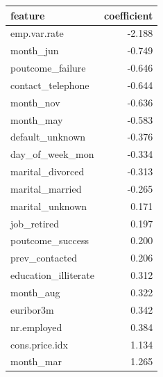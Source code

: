 \begin{tabular}{lr}
\toprule
feature & coefficient \\
\midrule
emp.var.rate & -2.188 \\
month\_jun & -0.749 \\
poutcome\_failure & -0.646 \\
contact\_telephone & -0.644 \\
month\_nov & -0.636 \\
month\_may & -0.583 \\
default\_unknown & -0.376 \\
day\_of\_week\_mon & -0.334 \\
marital\_divorced & -0.313 \\
marital\_married & -0.265 \\
marital\_unknown & 0.171 \\
job\_retired & 0.197 \\
poutcome\_success & 0.200 \\
prev\_contacted & 0.206 \\
education\_illiterate & 0.312 \\
month\_aug & 0.322 \\
euribor3m & 0.342 \\
nr.employed & 0.384 \\
cons.price.idx & 1.134 \\
month\_mar & 1.265 \\
\bottomrule
\end{tabular}